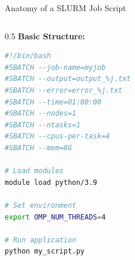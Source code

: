 \documentclass[aspectratio=169,xcolor={dvipsnames}]{beamer}
\begin{document}
\begin{frame}[fragile]{Anatomy of a SLURM Job Script}
    \vspace{-1em}
    \begin{columns}[T]
        \begin{column}{0.5\textwidth}
            \textbf{Basic Structure:}
            \begin{lstlisting}[language=bash, basicstyle=\tiny\ttfamily]
#!/bin/bash
#SBATCH --job-name=myjob
#SBATCH --output=output_%j.txt
#SBATCH --error=error_%j.txt
#SBATCH --time=01:00:00
#SBATCH --nodes=1
#SBATCH --ntasks=1
#SBATCH --cpus-per-task=4
#SBATCH --mem=8G

# Load modules
module load python/3.9

# Set environment
export OMP_NUM_THREADS=4

# Run application
python my_script.py
            \end{lstlisting}
        \end{column}
    \end{columns}
\end{frame}
\end{document}
